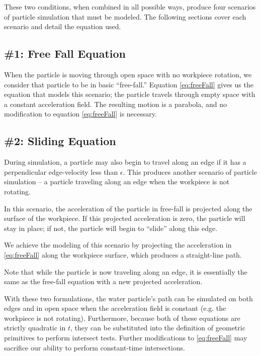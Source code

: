 These two conditions, when combined in all possible ways, produce four scenarios of particle simulation that must be modeled. The following sections cover each scenario and detail the equation used.

		\subsection{\#1: Free Fall Equation}

When the particle is moving through open space with no workpiece rotation, we consider that particle to be in basic ``free-fall.'' Equation \eqref{eq:freeFall} gives us the equation that models this scenario; the particle travels through empty space with a constant acceleration field. The resulting motion is a parabola, and no modification to equation \eqref{eq:freeFall} is necessary.


		\subsection{\#2: Sliding Equation}

During simulation, a particle may also begin to travel along an edge if it has a perpendicular edge-velocity less than $\epsilon$. This produces another scenario of particle simulation -- a particle traveling along an edge when the workpiece is not rotating.

In this scenario, the acceleration of the particle in free-fall is projected along the surface of the workpiece. If this projected acceleration is zero, the particle will stay in place; if not, the particle will begin to ``slide'' along this edge.

We achieve the modeling of this scenario by projecting the acceleration in \eqref{eq:freeFall} along the workpiece surface, which produces a straight-line path.

Note that while the particle is now traveling along an edge, it is essentially the same as the free-fall equation with a new projected acceleration.



With these two formulations, the water particle's path can be simulated on both edges and in open space when the acceleration field is constant (e.g. the workpiece is not rotating). Furthermore, because both of these equations are strictly quadratic in $t$, they can be substituted into the definition of geometric primitives to perform intersect tests. Further modifications to \eqref{eq:freeFall} may sacrifice our ability to perform constant-time intersections.


